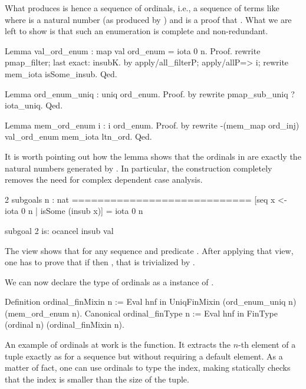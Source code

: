 What  produces is hence a sequence of ordinals, i.e.,
a sequence of terms like  where  is a natural
number (as produced by ) and  is a proof that .  What we are left to show is that such an enumeration is complete
and non-redundant.

\begin{coq}{}{}
Lemma val_ord_enum : map val ord_enum = iota 0 n.
Proof.
rewrite pmap_filter; last exact: insubK.
by apply/all_filterP; apply/allP=> i; rewrite mem_iota isSome_insub.
Qed.

Lemma ord_enum_uniq : uniq ord_enum.
Proof. by rewrite pmap_sub_uniq ?iota_uniq. Qed.

Lemma mem_ord_enum i : i \in ord_enum.
Proof. by rewrite -(mem_map ord_inj) val_ord_enum mem_iota ltn_ord. Qed.
\end{coq}

It is worth pointing out how the  lemma
shows that the ordinals in  are exactly the
natural numbers generated by .  In particular,
the  construction completely removes the need for
complex dependent case analysis.

\begin{coqout}{}{}
2 subgoals
n : nat
============================
[seq x <- iota 0 n | isSome (insub x)] = iota 0 n

subgoal 2 is:
  ocancel insub val
\end{coqout}

The view  shows that
 for any
sequence  and predicate .  After applying
that view, one has to prove that if  then , that is trivialized by .

We can now declare the type of ordinals as a instance of .

\begin{coq}{}{}
Definition ordinal_finMixin n :=
  Eval hnf in UniqFinMixin (ord_enum_uniq n) (mem_ord_enum n).
Canonical ordinal_finType n :=
  Eval hnf in FinType (ordinal n) (ordinal_finMixin n).
\end{coq}

An example of ordinals at work is the  function.
It extracts the $n$-th element of a tuple exactly as
 for a sequence but without requiring a default element.
As a matter of fact, one can use ordinals to type the index, making
\Coq{} statically checks that the index is smaller than the size of
the tuple.


